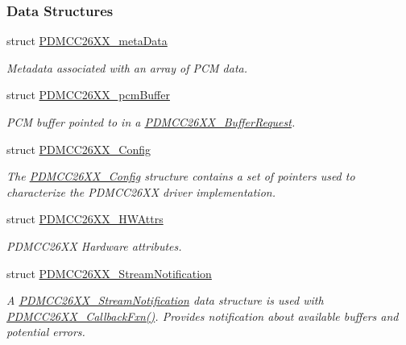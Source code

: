 \subsubsection*{Data Structures}
\begin{DoxyCompactItemize}
\item 
struct \hyperlink{struct_p_d_m_c_c26_x_x__meta_data}{P\+D\+M\+C\+C26\+X\+X\+\_\+meta\+Data}
\begin{DoxyCompactList}\small\item\em Metadata associated with an array of P\+C\+M data. \end{DoxyCompactList}\item 
struct \hyperlink{struct_p_d_m_c_c26_x_x__pcm_buffer}{P\+D\+M\+C\+C26\+X\+X\+\_\+pcm\+Buffer}
\begin{DoxyCompactList}\small\item\em P\+C\+M buffer pointed to in a \hyperlink{struct_p_d_m_c_c26_x_x___buffer_request}{P\+D\+M\+C\+C26\+X\+X\+\_\+\+Buffer\+Request}. \end{DoxyCompactList}\item 
struct \hyperlink{struct_p_d_m_c_c26_x_x___config}{P\+D\+M\+C\+C26\+X\+X\+\_\+\+Config}
\begin{DoxyCompactList}\small\item\em The \hyperlink{struct_p_d_m_c_c26_x_x___config}{P\+D\+M\+C\+C26\+X\+X\+\_\+\+Config} structure contains a set of pointers used to characterize the P\+D\+M\+C\+C26\+X\+X driver implementation. \end{DoxyCompactList}\item 
struct \hyperlink{struct_p_d_m_c_c26_x_x___h_w_attrs}{P\+D\+M\+C\+C26\+X\+X\+\_\+\+H\+W\+Attrs}
\begin{DoxyCompactList}\small\item\em P\+D\+M\+C\+C26\+X\+X Hardware attributes. \end{DoxyCompactList}\item 
struct \hyperlink{struct_p_d_m_c_c26_x_x___stream_notification}{P\+D\+M\+C\+C26\+X\+X\+\_\+\+Stream\+Notification}
\begin{DoxyCompactList}\small\item\em A \hyperlink{struct_p_d_m_c_c26_x_x___stream_notification}{P\+D\+M\+C\+C26\+X\+X\+\_\+\+Stream\+Notification} data structure is used with \hyperlink{_p_d_m_c_c26_x_x_8h_ab6fdee59a79029e938e3fbf0e446fa91}{P\+D\+M\+C\+C26\+X\+X\+\_\+\+Callback\+Fxn()}. Provides notification about available buffers and potential errors. \end{DoxyCompactList}\item 

\end{DoxyCompactItemize}
